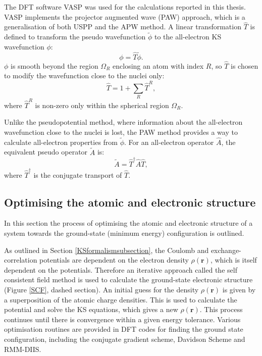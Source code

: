 The DFT software \textsc{VASP} was used for the calculations reported in this thesis. 
\textsc{VASP} implements the projector augmented wave (PAW) approach, which is a generalisation of both USPP and the APW method.\autocite{Blochl1994} A linear transformation $\hat{T}$ is defined to transform the pseudo wavefunction $\tilde{\phi}$ to the all-electron KS wavefunction $\phi$:\autocite{Rostgaard2009}
\begin{equation}
\phi = \hat{T}\tilde{\phi}.
\end{equation}
$\phi$ is smooth beyond the region $\Omega_R$ enclosing an atom with index $R$, so $\hat{T}$ is chosen to modify the wavefunction close to the nuclei only:\autocite{Rostgaard2009}
\begin{equation}
\hat{T} = 1+\sum_R \hat{T}^R,
\end{equation}
where $\hat{T}^R$ is non-zero only within the spherical region $\Omega_R$.

Unlike the pseudopotential method, where information about the all-electron wavefunction close to the nuclei is lost, the PAW method provides a way to calculate all-electron properties from $\tilde{\phi}$. For an all-electron operator $\hat{A}$, the equivalent pseudo operator $\tilde{A}$ is:\autocite{Rostgaard2009}
\begin{equation}
\tilde{A} = \hat{T}^\dagger\hat{A}\hat{T},
\end{equation}
where $\hat{T}^\dagger$ is the conjugate transport of $\hat{T}$.


\subsection{Optimising the atomic and electronic structure} \label{SCFsubsection}

In this section the process of optimising the atomic and electronic structure of a system towards the ground-state (minimum energy) configuration is outlined. 

As outlined in Section \ref{KSformalismsubsection}, the Coulomb and exchange-correlation potentials are dependent on the electron density $\rho(\mathbf{r})$, which is itself dependent on the potentials. Therefore an iterative approach called the self consistent field method is used to calculate the ground-state electronic structure (Figure \ref{SCF}, dashed section). An initial guess for the density $\rho(\textbf{r})$ is given by a superposition of the atomic charge densities. This is used to calculate the potential and solve the KS equations, which gives a new $\rho(\textbf{r})$. This process continues until there is convergence within a given energy tolerance. Various optimisation routines are provided in DFT codes for finding the ground state configuration, including the conjugate gradient scheme, Davidson Scheme and RMM-DIIS.

